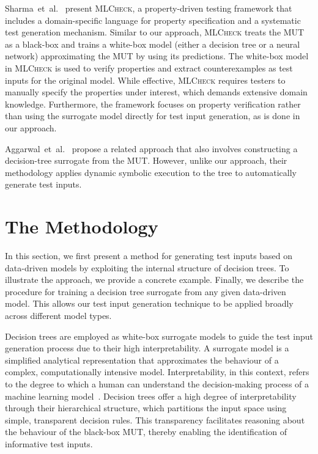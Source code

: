 \documentclass[
]{ceurart}
\theoremstyle{definition}
\begin{document}
Sharma~et~al.~\cite{mlcheck} present \textsc{MLCheck}, a property-driven testing framework that includes a domain-specific language for property specification and a systematic test generation mechanism. Similar to our approach, \textsc{MLCheck} treats the MUT as a black-box and trains a white-box model (either a decision tree or a neural network) approximating the MUT by using its predictions. The white-box model in \textsc{MLCheck} is used to verify properties and extract counterexamples as test inputs for the original model. While effective, \textsc{MLCheck} requires testers to manually specify the properties under interest, which demands extensive domain knowledge. Furthermore, the framework focuses on property verification rather than using the surrogate model directly for test input generation, as is done in our approach.

Aggarwal~et~al.~\cite{fairness} propose a related approach that also involves constructing a decision-tree surrogate from the MUT. However, unlike our approach, their methodology applies dynamic symbolic execution to the tree to automatically generate test inputs.


\section{The Methodology}
\label{sec:method}

In this section, we first present a method for generating test inputs based on data-driven models by exploiting the internal structure of decision trees. To illustrate the approach, we provide a concrete example. Finally, we describe the procedure for training a decision tree surrogate from any given data-driven model. This allows our test input generation technique to be applied broadly across different model types.

Decision trees are employed as white-box surrogate models to guide the test input generation process due to their high interpretability. A surrogate model is a simplified analytical representation that approximates the behaviour of a complex, computationally intensive model. Interpretability, in this context, refers to the degree to which a human can understand the decision-making process of a machine learning model~\cite{interpretability}. Decision trees offer a high degree of interpretability through their hierarchical structure, which partitions the input space using simple, transparent decision rules. This transparency facilitates reasoning about the behaviour of the black-box MUT, thereby enabling the identification of informative test inputs.
\end{document}
